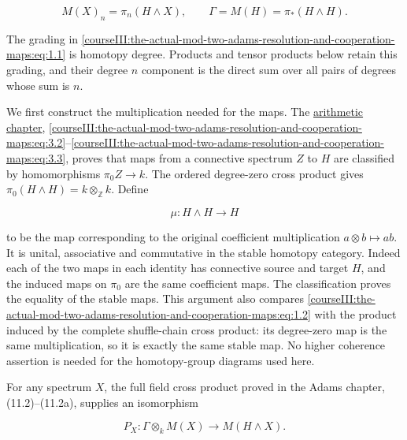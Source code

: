 \begin{equation}
M(X)_n=\pi_n(H\wedge X),\qquad \Gamma=M(H)=\pi_*(H\wedge H).
 \label{courseIII:the-actual-mod-two-adams-resolution-and-cooperation-maps:eq:1.1}
\end{equation}

The grading in \eqref{courseIII:the-actual-mod-two-adams-resolution-and-cooperation-maps:eq:1.1} is homotopy degree. Products and tensor products below retain this grading, and their degree \(n\) component is the direct sum over all pairs of degrees whose sum is \(n\).

We first construct the multiplication needed for the maps. The \href{https://github.com/KokunoYumeto/open-math-courses/blob/90d11e68827abca7e732dc3e6c343a26c4c82ba4/docs/courses/CG-S6/src/the-original-adams-tower-and-arithmetic-completion.md}{arithmetic chapter}, \eqref{courseIII:the-actual-mod-two-adams-resolution-and-cooperation-maps:eq:3.2}--\eqref{courseIII:the-actual-mod-two-adams-resolution-and-cooperation-maps:eq:3.3}, proves that maps from a connective spectrum \(Z\) to \(H\) are classified by homomorphisms \(\pi_0Z\to k\). The ordered degree-zero cross product gives \(\pi_0(H\wedge H)=k\otimes_{\mathbb Z}k\). Define

\begin{equation}
\mu:H\wedge H\longrightarrow H
 \label{courseIII:the-actual-mod-two-adams-resolution-and-cooperation-maps:eq:1.2}
\end{equation}

to be the map corresponding to the original coefficient multiplication \(a\otimes b\mapsto ab\). It is unital, associative and commutative in the stable homotopy category. Indeed each of the two maps in each identity has connective source and target \(H\), and the induced maps on \(\pi_0\) are the same coefficient maps. The classification proves the equality of the stable maps. This argument also compares \eqref{courseIII:the-actual-mod-two-adams-resolution-and-cooperation-maps:eq:1.2} with the product induced by the complete shuffle-chain cross product: its degree-zero map is the same multiplication, so it is exactly the same stable map. No higher coherence assertion is needed for the homotopy-group diagrams used here.

For any spectrum \(X\), the full field cross product proved in the Adams chapter, (11.2)--(11.2a), supplies an isomorphism

\begin{equation}
P_X:\Gamma\otimes_k M(X)\longrightarrow M(H\wedge X).
 \label{courseIII:the-actual-mod-two-adams-resolution-and-cooperation-maps:eq:1.3}
\end{equation}

